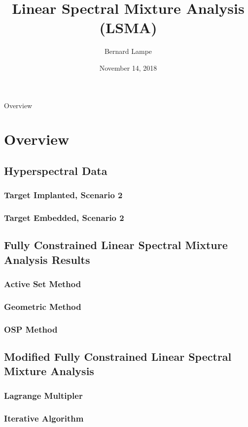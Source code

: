 \documentclass{beamer}
\title[LSMA]{Linear Spectral Mixture Analysis (LSMA)}
\author{Bernard Lampe}
\date{November 14, 2018}
\begin{document}
\begin{frame}
\titlepage
\end{frame}

\begin{frame}{Overview}
\tableofcontents
\end{frame}

\section{Overview}
\subsection{Hyperspectral Data}
    \subsubsection{Target Implanted, Scenario 2}
    \subsubsection{Target Embedded, Scenario 2}
\subsection{Fully Constrained Linear Spectral Mixture Analysis Results}
    \subsubsection{Active Set Method}
    \subsubsection{Geometric Method}
    \subsubsection{OSP Method}
\subsection{Modified Fully Constrained Linear Spectral Mixture Analysis}
    \subsubsection{Lagrange Multipler}
    \subsubsection{Iterative Algorithm}
\end{document}
